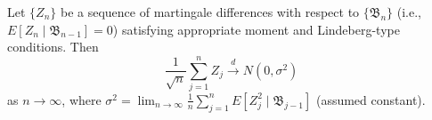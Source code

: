 Let $\{Z_n\}$ be a sequence of martingale differences with respect to $\{\mathfrak{B}_n\}$ (i.e., $E[Z_n \mid \mathfrak{B}_{n-1}] = 0$) satisfying appropriate moment and Lindeberg-type conditions. Then
$$\frac{1}{\sqrt{n}} \sum_{j=1}^{n} Z_j \xrightarrow{d} N(0, \sigma^2)$$
as $n \to \infty$, where $\sigma^2 = \lim_{n \to \infty} \frac{1}{n} \sum_{j=1}^{n} E[Z_j^2 \mid \mathfrak{B}_{j-1}]$ (assumed constant).
